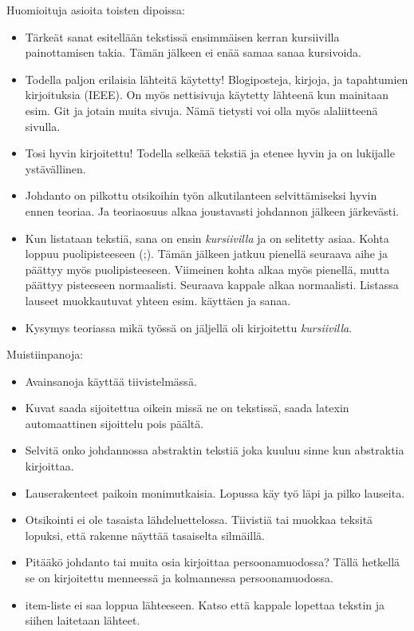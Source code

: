 Huomioituja asioita toisten dipoissa:
\begin{itemize}
	\item Tärkeät sanat esitellään tekstissä ensimmäisen kerran kursiivilla painottamisen takia. Tämän jälkeen ei enää samaa sanaa kursivoida.
	\item Todella paljon erilaisia lähteitä käytetty! Blogiposteja, kirjoja, ja tapahtumien kirjoituksia (IEEE). On myös nettisivuja käytetty lähteenä kun mainitaan esim. Git ja jotain muita sivuja. Nämä tietysti voi olla myös alaliitteenä sivulla.
	\item Tosi hyvin kirjoitettu! Todella selkeää tekstiä ja etenee hyvin ja on lukijalle ystävällinen.
	\item Johdanto on pilkottu otsikoihin työn alkutilanteen selvittämiseksi hyvin ennen teoriaa. Ja teoriaosuus alkaa joustavasti johdannon jälkeen järkevästi.
	\item Kun listataan tekstiä, sana on ensin \emph{kursiivilla} ja on selitetty asiaa. Kohta loppuu puolipisteeseen (;). Tämän jälkeen jatkuu pienellä seuraava aihe ja päättyy myös puolipisteeseen. Viimeinen kohta alkaa myös pienellä, mutta päättyy pisteeseen normaalisti. Seuraava kappale alkaa normaalisti. Listassa lauseet muokkautuvat yhteen esim. käyttäen ja sanaa.
	\item Kysymys teoriassa mikä työssä on jäljellä oli kirjoitettu \emph{kursiivilla}.
\end{itemize}

Muistiinpanoja:
\begin{itemize}
	\item Avainsanoja käyttää tiivistelmässä.
	\item Kuvat saada sijoitettua oikein missä ne on tekstissä, saada latexin automaattinen sijoittelu pois päältä.
	\item Selvitä onko johdannossa abstraktin tekstiä joka kuuluu sinne kun abstraktia kirjoittaa.
	\item Lauserakenteet paikoin monimutkaisia. Lopussa käy työ läpi ja pilko lauseita.
	\item Otsikointi ei ole tasaista lähdeluettelossa. Tiivistiä tai muokkaa teksitä lopuksi, että rakenne näyttää tasaiselta silmäillä.
	\item Pitääkö johdanto tai muita osia kirjoittaa persoonamuodossa? Tällä hetkellä se on kirjoitettu menneessä ja kolmannessa persoonamuodossa.
	\item item-liste ei saa loppua lähteeseen. Katso että kappale lopettaa tekstin ja siihen laitetaan lähteet.
\end{itemize}